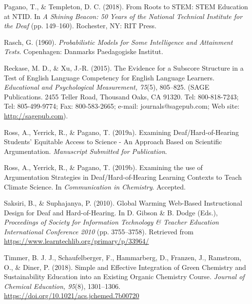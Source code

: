 \documentclass[11.5pt]{sig-alternate} %
\begin{document}
Pagano, T., \& Templeton, D. C. (2018). From Roots to STEM: STEM Education at NTID. In \textit{A Shining Beacon: 50 Years of the National Technical Institute for the Deaf} (pp. 149–160). Rochester, NY: RIT Press.

Rasch, G. (1960). \textit{Probabilistic Models for Some Intelligence and Attainment Tests}. Copenhagen: Danmarks Paedagogiske Institut.

Reckase, M. D., \& Xu, J.-R. (2015). The Evidence for a Subscore Structure in a Test of English Language Competency for English Language Learners. \textit{Educational and Psychological Measurement, 75}(5), 805–825. (SAGE Publications. 2455 Teller Road, Thousand Oaks, CA 91320. Tel: 800-818-7243; Tel: 805-499-9774; Fax: 800-583-2665; e-mail: journals@sagepub.com; Web site: \url{http://sagepub.com}).

Ross, A., Yerrick, R., \& Pagano, T. (2019a). Examining Deaf/Hard-of-Hearing Students’ Equitable Access to Science - An Approach Based on Scientific Argumentation. \textit{Manuscript Submitted for Publication}.

Ross, A., Yerrick, R., \& Pagano, T. (2019b). Examining the use of Argumentation Strategies in Deaf/Hard-of-Hearing Learning Contexts to Teach Climate Science. In \textit{Communication in Chemistry}. Accepted.

Saksiri, B., \& Suphajanya, P. (2010). Global Warming Web-Based Instructional Design for Deaf and Hard-of-Hearing. In D. Gibson \& B. Dodge (Eds.), \textit{Proceedings of Society for Information Technology \& Teacher Education International Conference 2010} (pp. 3755–3758). Retrieved from \url{https://www.learntechlib.org/primary/p/33964/}

Timmer, B. J. J., Schaufelberger, F., Hammarberg, D., Franzen, J., Ramstrom, O., \& Diner, P. (2018). Simple and Effective Integration of Green Chemistry and Sustainability Education into an Existing Organic Chemistry Course. \textit{Journal of Chemical Education, 95}(8), 1301–1306. \url{https://doi.org/10.1021/acs.jchemed.7b00720}
\end{document}
